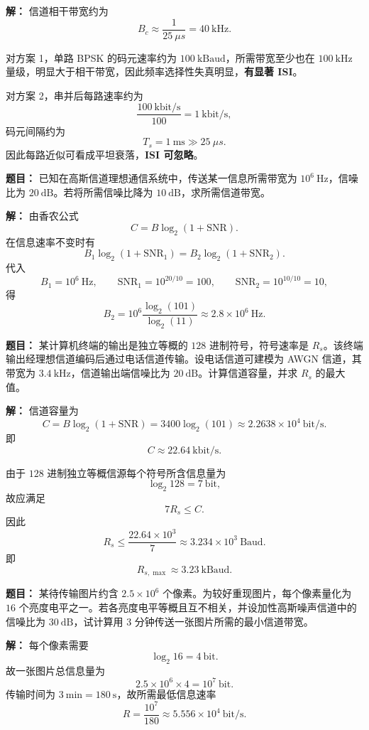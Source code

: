 \par\textbf{解：}
信道相干带宽约为
\[
B_c\approx \frac{1}{25\ \mu s}=40\ \text{kHz}.
\]

对方案 1，单路 BPSK 的码元速率约为 $100\ \text{kBaud}$，所需带宽至少也在 $100\ \text{kHz}$ 量级，明显大于相干带宽，因此频率选择性失真明显，\textbf{有显著 ISI}。

对方案 2，串并后每路速率约为
\[
\frac{100\ \text{kbit/s}}{100}=1\ \text{kbit/s},
\]
码元间隔约为
\[
T_s=1\ \text{ms}\gg 25\ \mu s.
\]
因此每路近似可看成平坦衰落，\textbf{ISI 可忽略}。

\medskip
{}
\textbf{题目：}
已知在高斯信道理想通信系统中，传送某一信息所需带宽为 $10^6\ \text{Hz}$，信噪比为 $20\ \text{dB}$。若将所需信噪比降为 $10\ \text{dB}$，求所需信道带宽。

\par\textbf{解：}
由香农公式
\[
C=B\log_2(1+\mathrm{SNR}).
\]
在信息速率不变时有
\[
B_1\log_2(1+\mathrm{SNR}_1)=B_2\log_2(1+\mathrm{SNR}_2).
\]
代入
\[
B_1=10^6\ \text{Hz},\qquad \mathrm{SNR}_1=10^{20/10}=100,\qquad \mathrm{SNR}_2=10^{10/10}=10,
\]
得
\[
B_2=10^6\frac{\log_2(101)}{\log_2(11)}\approx 2.8\times 10^6\ \text{Hz}.
\]

\medskip
{}
\textbf{题目：}
某计算机终端的输出是独立等概的 $128$ 进制符号，符号速率是 $R_s$。该终端输出经理想信道编码后通过电话信道传输。设电话信道可建模为 AWGN 信道，其带宽为 $3.4\ \text{kHz}$，信道输出端信噪比为 $20\ \text{dB}$。计算信道容量，并求 $R_s$ 的最大值。

\par\textbf{解：}
信道容量为
\[
C=B\log_2(1+\mathrm{SNR})=3400\log_2(101)\approx 2.2638\times 10^4\ \text{bit/s}.
\]
即
\[
C\approx 22.64\ \text{kbit/s}.
\]

由于 $128$ 进制独立等概信源每个符号所含信息量为
\[
\log_2 128=7\ \text{bit},
\]
故应满足
\[
7R_s\le C.
\]
因此
\[
R_s\le \frac{22.64\times 10^3}{7}\approx 3.234\times 10^3\ \text{Baud}.
\]
即
\[
R_{s,\max}\approx 3.23\ \text{kBaud}.
\]

\medskip
{}
\textbf{题目：}
某待传输图片约含 $2.5\times 10^6$ 个像素。为较好重现图片，每个像素量化为 $16$ 个亮度电平之一。若各亮度电平等概且互不相关，并设加性高斯噪声信道中的信噪比为 $30\ \text{dB}$，试计算用 $3$ 分钟传送一张图片所需的最小信道带宽。

\par\textbf{解：}
每个像素需要
\[
\log_2 16=4\ \text{bit}.
\]
故一张图片总信息量为
\[
2.5\times 10^6\times 4=10^7\ \text{bit}.
\]
传输时间为 $3\ \text{min}=180\ \text{s}$，故所需最低信息速率
\[
R=\frac{10^7}{180}\approx 5.556\times 10^4\ \text{bit/s}.
\]

